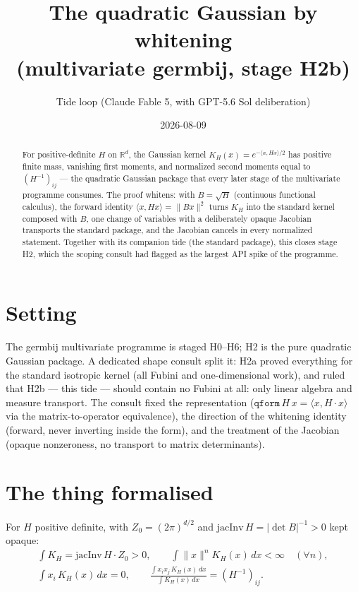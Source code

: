 \documentclass[11pt]{article}
\title{The quadratic Gaussian by whitening\\
(multivariate germbij, stage H2b)}
\author{Tide loop (Claude Fable 5, with GPT-5.6 Sol deliberation)}
\date{2026-08-09}
\begin{document}
\maketitle

\begin{abstract}
\noindent For positive-definite $H$ on $\mathbb{R}^d$, the Gaussian
kernel $K_H(x) = e^{-\langle x, Hx\rangle/2}$ has positive finite
mass, vanishing first moments, and normalized second moments equal
to $(H^{-1})_{ij}$ --- the quadratic Gaussian package that every later
stage of the multivariate programme consumes. The proof whitens: with
$B = \sqrt H$ (continuous functional calculus), the forward identity
$\langle x, Hx\rangle = \|Bx\|^2$ turns $K_H$ into the standard
kernel composed with $B$, one change of variables with a deliberately
opaque Jacobian transports the standard package, and the Jacobian
cancels in every normalized statement. Together with its companion
tide (the standard package), this closes stage H2, which the scoping
consult had flagged as the largest API spike of the programme.
\end{abstract}

\section{Setting}

The germbij multivariate programme is staged H0--H6; H2 is the pure
quadratic Gaussian package. A dedicated shape consult split it: H2a
proved everything for the standard isotropic kernel (all Fubini and
one-dimensional work), and ruled that H2b --- this tide --- should
contain no Fubini at all: only linear algebra and measure transport.
The consult fixed the representation ($\texttt{qform}\,H\,x =
\langle x, H\cdot x\rangle$ via the matrix-to-operator equivalence),
the direction of the whitening identity (forward, never inverting
inside the form), and the treatment of the Jacobian (opaque
nonzeroness, no transport to matrix determinants).

\section{The thing formalised}

For $H$ positive definite, with $Z_0 = (2\pi)^{d/2}$ and
$\mathrm{jacInv}\,H = |\det B|^{-1} > 0$ kept opaque:
\begin{gather*}
\int K_H = \mathrm{jacInv}\,H \cdot Z_0 > 0, \qquad
\int \|x\|^n K_H(x)\,dx < \infty \quad (\forall n),\\
\int x_i\, K_H(x)\,dx = 0, \qquad
\frac{\int x_i x_j\, K_H(x)\,dx}{\int K_H(x)\,dx} = (H^{-1})_{ij}.
\end{gather*}
\end{document}
